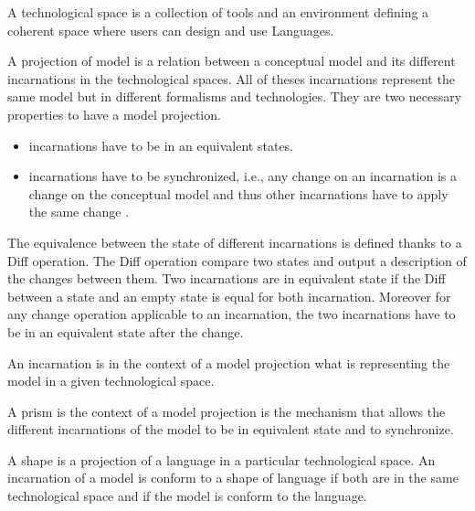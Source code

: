 \begin{definition}
A technological space is a collection of tools and an environment defining a coherent space where users can design and use Languages.
\end{definition}

\begin{definition}
A projection of model is a relation between a conceptual model and its different incarnations in the technological spaces.
All of theses incarnations represent the same model but in different formalisms and technologies.
They are two necessary properties to have a model projection.
\begin{itemize}
	\item incarnations have to be in an equivalent  states.
	\item incarnations have to be synchronized, i.e., any change on an incarnation is a change on the conceptual model and thus other incarnations have to apply the same change .
\end{itemize}
\end{definition}

\begin{definition}
The equivalence between the state of different incarnations is defined thanks to a Diff operation.
The Diff operation compare two states and output a description of the changes between them.
Two incarnations are in equivalent state if the Diff between a state and an empty state is equal for both incarnation.
Moreover for any change operation applicable to an incarnation, the two incarnations have to be in an equivalent state after the change.
\end{definition}

\begin{definition}
An incarnation is in the context of a model projection what is representing the model in a given technological space.
\end{definition}

\begin{definition}
A prism is the context of a model projection is the mechanism that allows the different incarnations of the model to be in equivalent state and to synchronize.
\end{definition}

\begin{definition}
A shape is a projection of a language in a particular technological space.
An incarnation of a model is conform to a shape of language if both are in the same technological space and if the model is conform to the language.
\end{definition}
